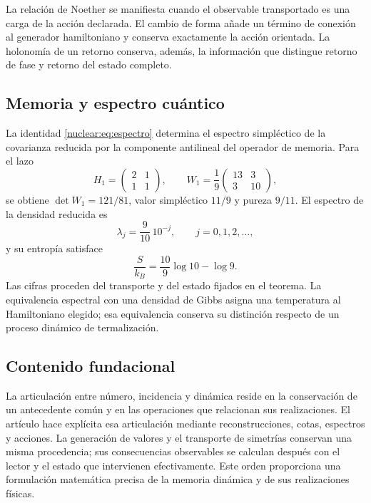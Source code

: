 La relación de Noether se manifiesta cuando el observable transportado es una carga de la acción declarada. El cambio de forma añade un término de conexión al generador hamiltoniano y conserva exactamente la acción orientada. La holonomía de un retorno conserva, además, la información que distingue retorno de fase y retorno del estado completo.

\subsection{Memoria y espectro cuántico}
La identidad \eqref{nuclear:eq:espectro} determina el espectro simpléctico de la covarianza reducida por la componente antilineal del operador de memoria. Para el lazo
\[
H_1=\begin{pmatrix}2&1\\1&1\end{pmatrix},
\qquad
W_1=\frac19\begin{pmatrix}13&3\\3&10\end{pmatrix},
\]
se obtiene \(\det W_1=121/81\), valor simpléctico \(11/9\) y pureza \(9/11\). El espectro de la densidad reducida es
\[
\lambda_j=\frac9{10}\,10^{-j},\qquad j=0,1,2,\ldots,
\]
y su entropía satisface
\[
\frac{S}{k_B}=\frac{10}{9}\log10-\log9.
\]
Las cifras proceden del transporte y del estado fijados en el teorema. La equivalencia espectral con una densidad de Gibbs asigna una temperatura al Hamiltoniano elegido; esa equivalencia conserva su distinción respecto de un proceso dinámico de termalización.

\subsection{Contenido fundacional}
La articulación entre número, incidencia y dinámica reside en la conservación de un antecedente común y en las operaciones que relacionan sus realizaciones. El artículo hace explícita esa articulación mediante reconstrucciones, cotas, espectros y acciones. La generación de valores y el transporte de simetrías conservan una misma procedencia; sus consecuencias observables se calculan después con el lector y el estado que intervienen efectivamente. Este orden proporciona una formulación matemática precisa de la memoria dinámica y de sus realizaciones físicas.
